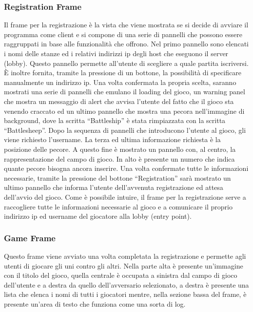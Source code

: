 \subsubsection{Registration Frame}
\label{subsubsection:progettazione_registration_frame}
Il frame per la registrazione è la vista che viene mostrata se si decide di
avviare il programma come client e si compone di una serie di pannelli che
possono essere raggruppati in base alle funzionalità che offrono.\newline
Nel primo pannello sono elencati i nomi delle stanze ed i relativi indirizzi ip
degli host che eseguono il server (lobby). Questo pannello permette all'utente
di scegliere a quale partita iscriversi. È inoltre fornita, tramite la pressione
di un bottone, la possibilità di specificare manualmente un indirizzo ip. Una
volta confermata la propria scelta, saranno mostrati una serie di pannelli che
emulano il loading del gioco, un warning panel che mostra un messaggio di alert
che avvisa l'utente del fatto che il gioco sta venendo craccato ed un ultimo
pannello che mostra una pecora nell'immagine di background, dove la scritta
``Battleship'' è stata rimpiazzata con la scritta ``Battlesheep''. Dopo la
sequenza di pannelli che introducono l'utente al gioco, gli viene richiesto
l'username. La terza ed ultima informazione richiesta è la posizione delle
pecore. A questo fine è mostrato un pannello con, al centro, la rappresentazione
del campo di gioco. In alto è presente un numero che indica quante pecore
bisogna ancora inserire. Una volta confermate tutte le informazioni necessarie,
tramite la pressione del bottone ``Registration'' sarà mostrato un ultimo
pannello che informa l'utente dell'avvenuta registrazione ed attesa dell'avvio
del gioco.\newline
Come è possibile intuire, il frame per la registrazione serve a raccogliere
tutte le informazioni necessarie al gioco e a comunicare il proprio indirizzo
ip ed username del giocatore alla lobby (entry point).



\subsubsection{Game Frame}
\label{subsubsection:progettazione_game_frame}
Questo frame viene avviato una volta completata la registrazione e permette agli
utenti di giocare gli uni contro gli altri.\newline
Nella parte alta è presente un'immagine con il titolo del gioco, quella centrale
è occupata a sinistra dal campo di gioco dell'utente e a destra da quello
dell'avversario selezionato, a destra è presente una lista che elenca i nomi di
tutti i giocatori mentre, nella sezione bassa del frame, è presente un'area di
testo che funziona come una sorta di log.
